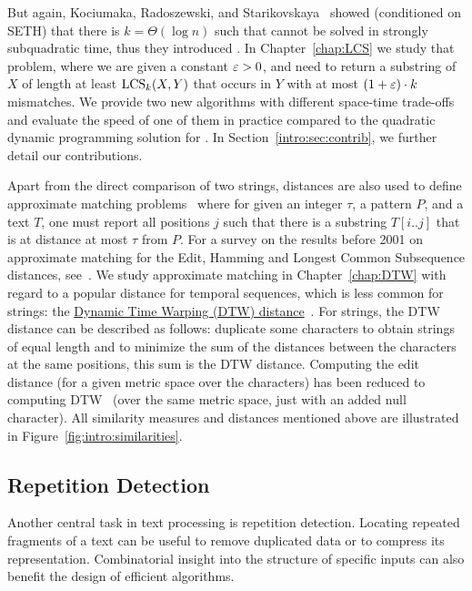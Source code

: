 But again, Kociumaka, Radoszewski, and Starikovskaya~\cite{DBLP:journals/algorithmica/KociumakaRS19} showed (conditioned on SETH) that there is $k=\Theta(\log n)$ such that \kLCS cannot be solved in strongly subquadratic time, thus they introduced \kApproxLCS.
In Chapter~\ref{chap:LCS} we study that problem, where we are given a constant $\varepsilon > 0$, and need to return a substring of $X$ of length at least $\mathrm{LCS}_{k}(X,Y)$ that occurs in $Y$ with at most $(1+\varepsilon) \cdot k$ mismatches. We provide two new algorithms with different space-time trade-offs and evaluate the speed of one of them in practice compared to the quadratic dynamic programming solution for \kLCS. In Section~\ref{intro:sec:contrib}, we further detail our contributions.

Apart from the direct comparison of two strings, distances are also used to define approximate matching problems~\cite{landau1986efficient,landau1989fast} where for given an integer $\tau$, a pattern $P$, and a text $T$, one must report all positions $j$ such that there is a substring $T[i..j]$ that is at distance at most $\tau$ from $P$.
For a survey on the results before 2001 on approximate matching for the Edit, Hamming and Longest Common Subsequence distances, see~\cite{navarro2001guided}.
We study approximate matching in Chapter~\ref{chap:DTW} with regard to a popular distance for temporal sequences, which is less common for strings: the \underline{Dynamic Time Warping (DTW) distance}~\cite{sakoe1978dynamic}. For strings, the DTW distance can be described as follows: duplicate some characters to obtain strings of equal length and to minimize the sum of the distances between the characters at the same positions, this sum is the DTW distance. Computing the edit distance (for a given metric space over the characters) has been reduced to computing DTW~\cite{DBLP:conf/icalp/Kuszmaul19} (over the same metric space, just with an added null character).
%
All similarity measures and distances mentioned above are illustrated in Figure~\ref{fig:intro:similarities}.



\subsection{Repetition Detection}

Another central task in text processing is repetition detection. Locating repeated fragments of a text can be useful to remove duplicated data or to compress its representation. Combinatorial insight into the structure of specific inputs can also benefit the design of efficient algorithms.

